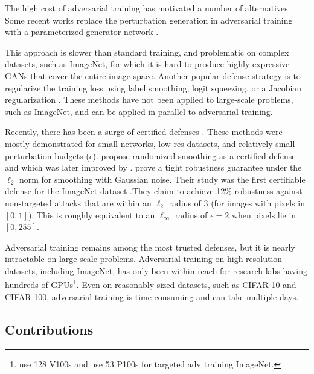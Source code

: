 \documentclass{article}
\begin{document}
The high cost of adversarial training has motivated a number of alternatives.
Some recent works replace the perturbation generation in adversarial training with a parameterized generator network \citep{baluja2017adversarial,poursaeed2017generative,xiao2018generating}.

This approach is slower than standard training, and problematic on complex datasets, such as ImageNet, for which it is hard to produce highly expressive GANs that cover the entire image space.
Another popular defense strategy is to regularize the training loss using label smoothing, logit squeezing, or a Jacobian regularization \citep{shafahi2019label,mosbach2018logit,ross2018improving,hein2017formal,jakubovitz2018improving,yu2018interpreting}. These methods have not been applied to large-scale problems, such as ImageNet, and can be applied in parallel to adversarial training. 

Recently, there has been a surge of certified defenses \citep{wong2017provable, wong2018scaling, raghunathan2018semidefinite, raghunathan2018certified, wang2018mixtrain}. These methods were mostly demonstrated for small networks, low-res datasets, and relatively small perturbation budgets ($\epsilon$). 
\citet{lecuyer2018certified} propose randomized smoothing as a certified defense and which was later improved by \citet{DBLP:journals/corr/abs-1809-03113}.  \citet{cohen2019certified} prove a tight robustness guarantee under the $\ell_2$ norm for smoothing with Gaussian noise.  
Their study was the first certifiable defense for the ImageNet dataset \citep{imagenet_cvpr09}.They claim to achieve 12\% robustness against non-targeted attacks that are within an $\ell_2$ radius of 3 (for images with pixels in $[0,1]$). This is roughly equivalent to an $\ell_{\infty}$ radius of $\epsilon=2$ when pixels lie in $[0,255]$. 

Adversarial training remains among the most trusted defenses, but it is nearly intractable on large-scale problems. Adversarial training on high-resolution datasets, including ImageNet, has only been within reach for research labs having hundreds of GPUs\footnote{\cite{xie2018feature} use 128 V100s and \cite{kannan2018adversarial} use 53 P100s for targeted adv training ImageNet.}. Even on reasonably-sized datasets, such as CIFAR-10 and CIFAR-100, adversarial training is time consuming and can take multiple days.


\subsection*{Contributions}
\end{document}

